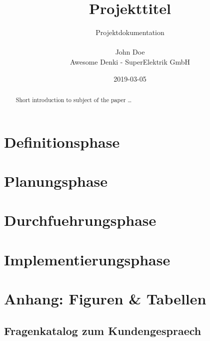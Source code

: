 \documentclass[11pt, a4paper]{article}
\title{Projekttitel}
\date{2019-03-05}
\author{Projektdokumentation\\
       \\
       John Doe\\
       Awesome Denki - SuperElektrik GmbH\\
}
\begin{document}
  \maketitle
  \newpage

  \tableofcontents
  \newpage

  \begin{abstract}
  Short introduction to subject of the paper \ldots
  \end{abstract}
  \section{Definitionsphase}
    
    \newpage

  \section{Planungsphase}
    
    \newpage

  \section{Durchfuehrungsphase}
    
    \newpage

  \section{Implementierungsphase}
    
    \newpage

    \begin{appendix}
      \listoffigures
      \listoftables
    \end{appendix}
    \newpage

  \section{Anhang: Figuren \& Tabellen}
    \subsection{Fragenkatalog zum Kundengespraech}
      
      \newpage
\end{document}
